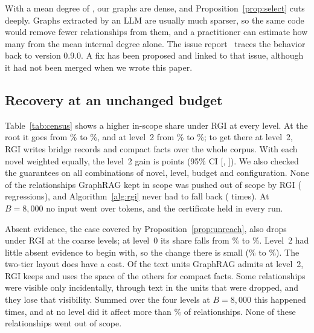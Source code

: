 \documentclass{ieeeaccess}
\theoremstyle{remark}
\begin{document}
\begin{table}[!htbp]
\caption{Within-community relationships reaching the standard pipeline's summary input (GraphRAG 3.1.1 \texttt{build\_local\_context}). Comm.\ = communities; Intra rels = within-community relationships; Cross rels in = cross-community relationships placed in inputs}\label{tab:selection}
\centering\footnotesize

\end{table}

With a mean degree of \MeanDegree, our graphs are dense, and Proposition~\ref{prop:select} cuts deeply. Graphs extracted by an LLM are usually much sparser, so the same code would remove fewer relationships from them, and a practitioner can estimate how many from the mean internal degree alone. The issue report~\cite{grenat2026issue} traces the behavior back to version 0.9.0. A fix has been proposed and linked to that issue, although it had not been merged when we wrote this paper.

\subsection{Recovery at an unchanged budget}\label{sec:recover}
Table~\ref{tab:census} shows a higher in-scope share under RGI at every level. At the root it goes from \CovAG\% to \CovAR\%, and at level~2 from \CovCG\% to \CovCR\%; to get there at level~2, RGI writes \BridgeC{} bridge records and \CompactC{} compact facts over the whole corpus. With each novel weighted equally, the level~2 gain is \MacroDiffC{} points (95\% CI [\MacroDiffCLo, \MacroDiffCHi]). We also checked the guarantees on all \CensusConfigs{} combinations of novel, level, budget and configuration. None of the relationships GraphRAG kept in scope was pushed out of scope by RGI (\Regressions{} regressions), and Algorithm~\ref{alg:rgi} never had to fall back (\Fallbacks{} times). At $B=8{,}000$ no input went over \MaxTokensRGI{} tokens, and the certificate held in every run.

Absent evidence, the case covered by Proposition~\ref{prop:unreach}, also drops under RGI at the coarse levels; at level~0 its share falls from \AbsAG\% to \AbsAR\%. Level~2 had little absent evidence to begin with, so the change there is small (\AbsCG\% to \AbsCR\%). The two-tier layout does have a cost. Of the \PassCG{} text units GraphRAG admits at level~2, RGI keeps \PassCR{} and uses the space of the others for compact facts. Some relationships were visible only incidentally, through text in the units that were dropped, and they lose that visibility. Summed over the four levels at $B=8{,}000$ this happened \ExpoRegrEight{} times, and at no level did it affect more than \ExpoRegrMaxShare\% of relationships. None of these relationships went out of scope.
\end{document}
